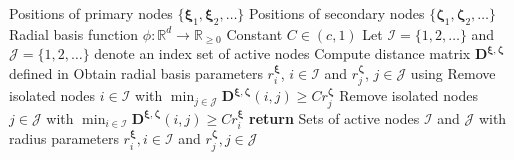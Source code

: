 \begin{algorithmic}[1]
    \Require Positions of primary nodes $\{\boldsymbol{\xi}_1, \boldsymbol{\xi}_2, \dots\}$
    \Require Positions of secondary nodes $\{\boldsymbol{\zeta}_1, \boldsymbol{\zeta}_2, \dots\}$
    \Require Radial basis function $\phi: \mathbb{R}^d \to \mathbb{R}_{\geq 0}$
    \Require Constant $C \in (c, 1)$
    \State Let $\mathcal{I} = \{1, 2, \dots \}$ and $\mathcal{J} = \{1, 2, \dots \}$ denote an index set of active nodes
    \State Compute distance matrix $\mathbf{D}^{\boldsymbol{\xi}, \boldsymbol{\zeta}}$ defined in 
        \State Obtain radial basis parameters $r^{\boldsymbol{\xi}}_i$, $i \in \mathcal{I}$ and
        $r^{\boldsymbol{\zeta}}_j$, $j \in \mathcal{J}$ using 
        \State Remove isolated nodes $i \in \mathcal{I}$ with $\min_{j \in \mathcal{J}} \mathbf{D}^{\boldsymbol{\xi}, \boldsymbol{\zeta}}(i, j) \geq Cr^{\boldsymbol{\zeta}}_j$ 
        \State Remove isolated nodes $j \in \mathcal{J}$ with $\min_{i \in \mathcal{I}} \mathbf{D}^{\boldsymbol{\xi}, \boldsymbol{\zeta}}(i, j) \geq Cr^{\boldsymbol{\xi}}_i$ 
    \EndWhile
    \State \textbf{return} Sets of active nodes $\mathcal{I}$ and $\mathcal{J}$ with radius parameters $r^{\boldsymbol{\xi}}_i, i \in \mathcal{I}$ and $r^{\boldsymbol{\zeta}}_j, j \in \mathcal{J}$
\end{algorithmic}
